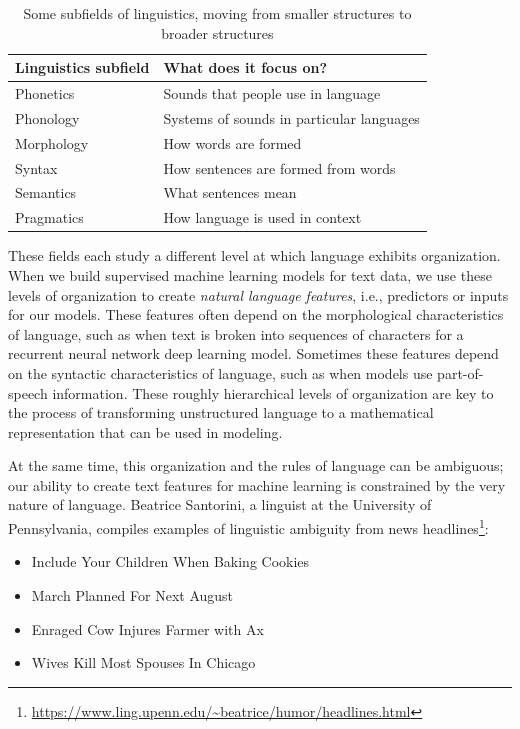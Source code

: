 \documentclass[
]{krantz}
\DeclareRobustCommand{\href}[2]{#2\footnote{\url{#1}}}
\renewcommand{\href}[2]{#2\footnote{\url{#1}}}
\begin{document}
\begin{table}

\caption{\label{tab:lingsubfields}Some subfields of linguistics, moving from smaller structures to broader structures}
\centering
\begin{tabular}[t]{ll}
\toprule
Linguistics subfield & What does it focus on?\\
\midrule
Phonetics & Sounds that people use in language\\
Phonology & Systems of sounds in particular languages\\
Morphology & How words are formed\\
Syntax & How sentences are formed from words\\
Semantics & What sentences mean\\
\addlinespace
Pragmatics & How language is used in context\\
\bottomrule
\end{tabular}
\end{table}

These fields each study a different level at which language exhibits organization. When we build supervised machine learning models for text data, we use these levels of organization to create \emph{natural language features}, i.e., predictors or inputs for our models. These features often depend on the morphological characteristics of language, such as when text is broken into sequences of characters for a recurrent neural network deep learning model. Sometimes these features depend on the syntactic characteristics of language, such as when models use part-of-speech information. These roughly hierarchical levels of organization are key to the process of transforming unstructured language to a mathematical representation that can be used in modeling.

At the same time, this organization and the rules of language can be ambiguous; our ability to create text features for machine learning is constrained by the very nature of language. Beatrice Santorini, a linguist at the University of Pennsylvania, compiles examples of linguistic ambiguity from \href{https://www.ling.upenn.edu/~beatrice/humor/headlines.html}{news headlines}:

\begin{itemize}
\item
  Include Your Children When Baking Cookies
\item
  March Planned For Next August
\item
  Enraged Cow Injures Farmer with Ax
\item
  Wives Kill Most Spouses In Chicago
\end{itemize}
\end{document}
